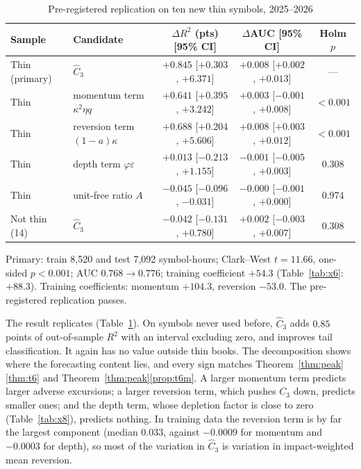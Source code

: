 \begin{table}[t]\centering
\begin{threeparttable}
\caption{Pre-registered replication on ten new thin symbols, 2025--2026}\label{tab:y6}
\small\setlength{\tabcolsep}{4pt}
\begin{tabular}{llccc}
\toprule
Sample & Candidate & $\Delta R^2$ (pts) [95\% CI] & $\Delta$AUC [95\% CI] & Holm $p$\\
\midrule
Thin (primary) & $\hat C_3$ & $+0.845$ [$+0.303$, $+6.371$] & $+0.008$ [$+0.002$, $+0.013$] & ---\\
Thin & momentum term $\kappa^2\eta q$ & $+0.641$ [$+0.395$, $+3.242$] & $+0.003$ [$-0.001$, $+0.008$] & $<0.001$\\
Thin & reversion term $(1-a)\kappa$ & $+0.688$ [$+0.204$, $+5.606$] & $+0.008$ [$+0.003$, $+0.012$] & $<0.001$\\
Thin & depth term $\varphi\varepsilon$ & $+0.013$ [$-0.213$, $+1.155$] & $-0.001$ [$-0.005$, $+0.003$] & 0.308\\
Thin & unit-free ratio $A$ & $-0.045$ [$-0.096$, $-0.031$] & $-0.000$ [$-0.001$, $+0.000$] & 0.974\\
Not thin (14) & $\hat C_3$ & $-0.042$ [$-0.131$, $+0.780$] & $+0.002$ [$-0.003$, $+0.007$] & 0.308\\
\bottomrule
\end{tabular}
\begin{tablenotes}\footnotesize\item Primary: train 8{,}520 and test 7{,}092 symbol-hours; Clark--West $t=11.66$, one-sided $p<0.001$; AUC $0.768\to0.776$; training coefficient $+54.3$ (Table~\ref{tab:x6}: $+88.3$). Training coefficients: momentum $+104.3$, reversion $-53.0$. The pre-registered replication passes. \end{tablenotes}
\end{threeparttable}
\end{table}

The result replicates (Table~\ref{tab:y6}). On symbols never used before, $\hat C_3$ adds $0.85$ points of out-of-sample $R^2$ with an interval excluding zero, and improves tail classification. It again has no value outside thin books. The decomposition shows where the forecasting content lies, and every sign matches Theorem~\ref{thm:peak}\ref{thm:t6} and Theorem~\ref{thm:peak}\ref{prop:t6m}. A larger momentum term predicts larger adverse excursions; a larger reversion term, which pushes $C_3$ down, predicts smaller ones; and the depth term, whose depletion factor is close to zero (Table~\ref{tab:x8}), predicts nothing. In training data the reversion term is by far the largest component (median $0.033$, against $-0.0009$ for momentum and $-0.0003$ for depth), so most of the variation in $\hat C_3$ is variation in impact-weighted mean reversion.

